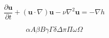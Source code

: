 \documentclass{article}
\begin{document}
\begin{equation*}
\frac{\partial{\mathbf{u}}}{\partial{t}}+(\mathbf{u}\cdot\nabla)\mathbf{u}-\nu\nabla^2\mathbf{u}=-\nabla h
\end{equation*}

\[
\alpha A \beta B \gamma \Gamma \delta \Delta \pi \Pi \omega \Omega 
\]

\end{document}
